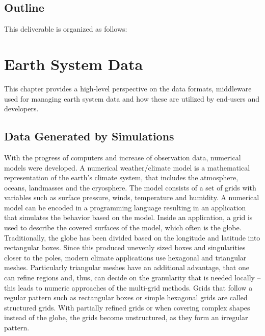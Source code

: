 \documentclass{../../template/esiwace-report}
\begin{document}
\section{Outline}

This deliverable is organized as follows:


\todo{}


\chapter{Earth System Data}

\begin{chapterIntro}
This chapter provides a high-level perspective on the data formats, middleware used for managing earth system data and how these are utilized by end-users and developers.
\end{chapterIntro}



\section{Data Generated by Simulations}

With the progress of computers and increase of observation data, numerical models were developed. 
A numerical weather/climate model is a mathematical representation of the earth’s climate system, that includes the atmosphere, oceans, landmasses and the cryosphere. 
The model consists of a set of grids with variables such as surface pressure, winds, temperature and humidity. 
A numerical model can be encoded in a programming language resulting in an application that simulates the behavior based on the model.
Inside an application, a grid is used to describe the covered surfaces of the model, which often is the globe.
Traditionally, the globe has been divided based on the longitude and latitude into rectangular boxes.
Since this produced unevenly sized boxes and singularities closer to the poles, modern climate applications use hexagonal and triangular meshes.
Particularly triangular meshes have an additional advantage, that one can refine regions and, thus, can decide on the granularity that is needed locally -- this leads to numeric approaches of the multi-grid methods.
Grids that follow a regular pattern such as rectangular boxes or simple hexagonal grids are called structured grids. 
With partially refined grids or when covering complex shapes instead of the globe, the grids become unstructured, as they form an irregular pattern.
\end{document}
